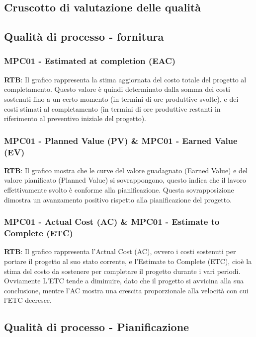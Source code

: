 \documentclass[10pt]{article}
\begin{document}
\begin{justify}
\section{Cruscotto di valutazione delle qualità}
\subsection{Qualità di processo - fornitura}
\subsubsection{MPC01 - Estimated at completion (EAC)}
\textbf{RTB}: Il grafico rappresenta la stima aggiornata del costo totale del progetto al completamento. Questo valore è quindi determinato dalla somma 
dei costi sostenuti fino a un certo momento (in termini di ore produttive svolte), e dei costi stimati al completamento (in termini di ore produttive 
restanti in riferimento al preventivo iniziale del progetto).\\ %
\subsubsection{MPC01 - Planned Value (PV) \& MPC01 - Earned Value (EV)}
\textbf{RTB}: Il grafico mostra che le curve del valore guadagnato (Earned Value) e del valore pianificato (Planned Value) si sovrappongono, questo indica 
che il lavoro effettivamente svolto è conforme alla pianificazione. Questa sovrapposizione dimostra un avanzamento positivo rispetto alla pianificazione del progetto.
\subsubsection{MPC01 - Actual Cost (AC) \& MPC01 - Estimate to Complete (ETC)}
\textbf{RTB}: Il grafico rappresenta l'Actual Cost (AC), ovvero i costi sostenuti per portare il progetto al suo stato corrente, e l'Estimate to Complete (ETC), 
cioè la stima del costo da sostenere per completare il progetto durante i vari periodi. \\
Ovviamente L'ETC tende a diminuire, dato che il progetto si avvicina alla sua conclusione, mentre l'AC mostra una crescita proporzionale alla velocità con cui 
l'ETC decresce.
\subsection{Qualità di processo - Pianificazione}

\end{justify}
\end{document}
